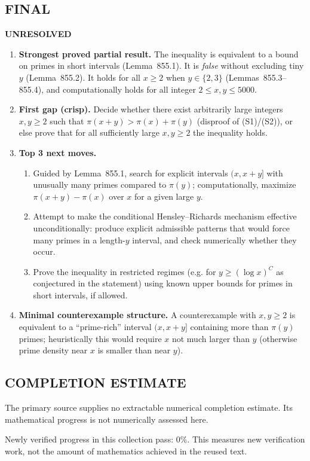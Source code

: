 \subsection*{FINAL}
\textbf{UNRESOLVED}
\begin{enumerate}
\item[(i)] \textbf{Strongest proved partial result.} The inequality is equivalent to a bound on primes in short intervals (Lemma~855.1). It is \emph{false} without excluding tiny $y$ (Lemma~855.2). It holds for all $x\ge 2$ when $y\in\{2,3\}$ (Lemmas~855.3--855.4), and computationally holds for all integer $2\le x,y\le 5000$.
\item[(ii)] \textbf{First gap (crisp).} Decide whether there exist arbitrarily large integers $x,y\ge 2$ such that $\pi(x+y)>\pi(x)+\pi(y)$ (disproof of (S1)/(S2)), or else prove that for all sufficiently large $x,y\ge 2$ the inequality holds.
\item[(iii)] \textbf{Top 3 next moves.}
  \begin{enumerate}
  \item Guided by Lemma~855.1, search for explicit intervals $(x,x+y]$ with unusually many primes compared to $\pi(y)$; computationally, maximize $\pi(x+y)-\pi(x)$ over $x$ for a given large $y$.
  \item Attempt to make the conditional Hensley--Richards mechanism effective unconditionally: produce explicit admissible patterns that would force many primes in a length-$y$ interval, and check numerically whether they occur.
  \item Prove the inequality in restricted regimes (e.g. for $y\ge (\log x)^C$ as conjectured in the statement) using known upper bounds for primes in short intervals, if allowed.
  \end{enumerate}
\item[(iv)] \textbf{Minimal counterexample structure.} A counterexample with $x,y\ge 2$ is equivalent to a ``prime-rich'' interval $(x,x+y]$ containing more than $\pi(y)$ primes; heuristically this would require $x$ not much larger than $y$ (otherwise prime density near $x$ is smaller than near $y$).
\end{enumerate}



\subsection*{COMPLETION ESTIMATE}
The primary source supplies no extractable numerical completion estimate. Its mathematical progress is not numerically assessed here.

Newly verified progress in this collection pass: $0\%$. This measures new verification work, not the amount of mathematics achieved in the reused text.
